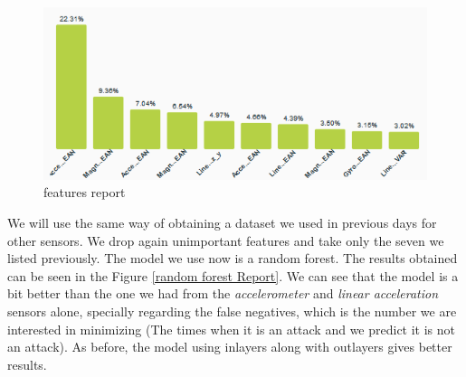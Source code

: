 \documentclass[idxtotoc,hyperref,openany]{labbook} %
\begin{document}
\begin{figure}[h]
\includegraphics[width=0.9\linewidth]{Milestone3/Feature_Importance.png}
\setlength\belowcaptionskip{-10pt}
\caption{features report}
\label{features Report}
\end{figure}


We will use the same way of obtaining a dataset we used in previous days for other sensors. We drop again unimportant features and take only the seven we listed previously. The model we use now is a random forest. The results obtained can be seen in the Figure \ref{random forest Report}. We can see that the model is a bit better than the one we had from the \textit{accelerometer} and \textit{linear acceleration} sensors alone, specially regarding the false negatives, which is the number we are interested in minimizing (The times when it is an attack and we predict it is not an attack). As before, the model using inlayers along with outlayers gives better results.
\end{document}
